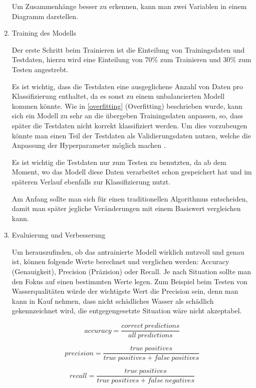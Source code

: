 \begin{enumerate}
            Um Zusammenhänge besser zu erkennen, kann man zwei Variablen in einem Diagramm darstellen.

      \item Training des Modells

            Der erste Schritt beim Trainieren ist die Einteilung von Trainingsdaten und Testdaten, hierzu wird eine Einteilung von 70\% zum Trainieren und 30\% zum Testen angestrebt.

            Es ist wichtig, dass die Testdaten eine ausgeglichene Anzahl von Daten pro Klassifizierung enthaltet, da es sonst zu einem unbalancierten Modell kommen könnte. Wie in \ref{overfitting} (Overfitting) beschrieben wurde, kann sich ein Modell zu sehr an die übergeben Trainingsdaten anpassen, so, dass später die Testdaten nicht korrekt klassifiziert werden. Um dies vorzubeugen könnte man einen Teil der Testdaten als Validierungsdaten nutzen, welche die Anpassung der Hyperparameter möglich machen \cite{DatenZumTrainieren}.

            Es ist wichtig die Testdaten nur zum Testen zu benutzten, da ab dem Moment, wo das Modell diese Daten verarbeitet schon gespeichert hat und im späteren Verlauf ebenfalls zur Klassifizierung nutzt.

            Am Anfang sollte man sich für einen traditionellen Algorithmus entscheiden, damit man später jegliche Veränderungen mit einem Basiswert vergleichen kann.

      \item Evaluierung und Verbesserung

            Um herauszufinden, ob das antrainierte Modell wirklich nutzvoll und genau ist, können folgende Werte berechnet und verglichen werden: Accuracy (Genauigkeit), Precision (Präzision) oder Recall. Je nach Situation sollte man den Fokus auf einen bestimmten Werte legen. Zum Beispiel beim Testen von Wasserqualitäten würde der wichtigste Wert die Precision sein, denn man kann in Kauf nehmen, dass nicht schädliches Wasser als schädlich gekennzeichnet wird, die entgegengesetzte Situation wäre nicht akzeptabel. \cite{APR}

            \begin{figure}[H]
                  \[ accuracy = \frac{correct\ predictions}{all\ predictions}  \]

                  \[ precision = \frac{true\ positives}{true\ positives + false\ positives}  \]

                  \[ recall = \frac{true\ positives}{true\ positives + false\ negatives}  \]


\end{figure}
\end{enumerate}
